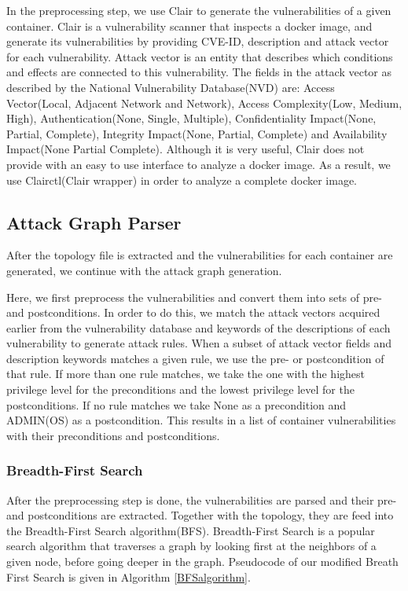 In the preprocessing step, we use Clair to generate the vulnerabilities of a given container. Clair is a vulnerability scanner that inspects a docker image, and generate its vulnerabilities by providing CVE-ID, description and attack vector for each vulnerability. Attack vector is an entity that describes which conditions and effects are connected to this vulnerability. The fields in the attack vector as described by the National Vulnerability Database(NVD) \cite{booth2013national} are: Access Vector(Local, Adjacent Network and Network), Access Complexity(Low, Medium, High), Authentication(None, Single, Multiple), Confidentiality Impact(None, Partial, Complete), Integrity Impact(None, Partial, Complete) and Availability Impact(None Partial Complete). Although it is very useful, Clair does not provide with an easy to use interface to analyze a docker image. As a result, we use Clairctl(Clair wrapper) in order to analyze a complete docker image.
	
	
\subsection{Attack Graph Parser}

	
After the topology file is extracted and the vulnerabilities for each container are generated, we continue with the attack graph generation.
	
Here, we first preprocess the vulnerabilities and convert them into sets of pre- and postconditions. In order to do this, we match the attack vectors acquired earlier from the vulnerability database and keywords of the descriptions of each vulnerability to generate attack rules. When a subset of attack vector fields and description keywords matches a given rule, we use the pre- or postcondition of that rule. If more than one rule matches, we take the one with the highest privilege level for the preconditions an\label{chap:attack_graph_p}d the lowest privilege level for the postconditions. If no rule matches we take None as a precondition and ADMIN(OS) as a postcondition. This results in a list of container vulnerabilities with their preconditions and postconditions.
	
\subsubsection{Breadth-First Search}
\label{chap:bfs}

After the preprocessing step is done, the vulnerabilities are parsed and their pre- and postconditions are extracted. Together with the topology, they are feed into the Breadth-First Search algorithm(BFS).
Breadth-First Search is a popular search algorithm that traverses a graph by looking first at the neighbors of a given node, before going deeper in the graph. Pseudocode of our modified Breath First Search is given in Algorithm \ref{BFSalgorithm}. 
	
